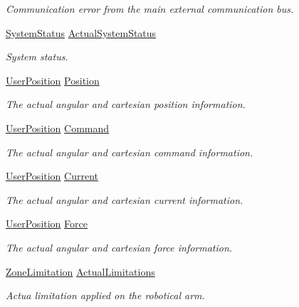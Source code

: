 \begin{DoxyCompactItemize}
\begin{DoxyCompactList}\small\item\em Communication error from the main external communication bus. \end{DoxyCompactList}\item 
\hyperlink{struct_system_status}{System\+Status} \hyperlink{struct_general_informations_ac1ff05432bd5c95b73b50b9d38830105}{Actual\+System\+Status}
\begin{DoxyCompactList}\small\item\em System status. \end{DoxyCompactList}\item 
\hyperlink{struct_user_position}{User\+Position} \hyperlink{struct_general_informations_a1bdb970acfdca928cf01a6850dc3ff3a}{Position}
\begin{DoxyCompactList}\small\item\em The actual angular and cartesian position information. \end{DoxyCompactList}\item 
\hyperlink{struct_user_position}{User\+Position} \hyperlink{struct_general_informations_aff852c9c84a0b313f311e1e222508cf7}{Command}
\begin{DoxyCompactList}\small\item\em The actual angular and cartesian command information. \end{DoxyCompactList}\item 
\hyperlink{struct_user_position}{User\+Position} \hyperlink{struct_general_informations_adecf04bc979eae4013a1dc4c5d2e43db}{Current}
\begin{DoxyCompactList}\small\item\em The actual angular and cartesian current information. \end{DoxyCompactList}\item 
\hyperlink{struct_user_position}{User\+Position} \hyperlink{struct_general_informations_a9f590b4fb00dc71b195348fbd18cc428}{Force}
\begin{DoxyCompactList}\small\item\em The actual angular and cartesian force information. \end{DoxyCompactList}\item 
\hyperlink{struct_zone_limitation}{Zone\+Limitation} \hyperlink{struct_general_informations_a025752cc70001b073d606f277c410d93}{Actual\+Limitations}
\begin{DoxyCompactList}\small\item\em Actua limitation applied on the robotical arm. \end{DoxyCompactList}\item 

\end{DoxyCompactItemize}
